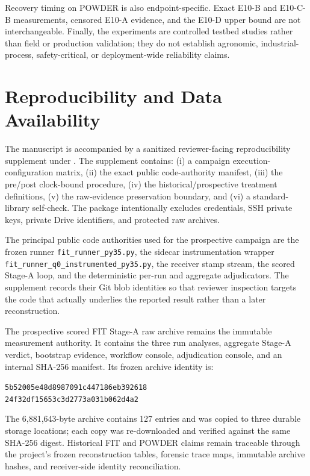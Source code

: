 \documentclass[journal]{IEEEtran}
\begin{document}
Recovery timing on POWDER is also endpoint-specific. Exact E10-B and E10-C-B measurements, censored E10-A evidence, and the E10-D upper bound are not interchangeable. Finally, the experiments are controlled testbed studies rather than field or production validation; they do not establish agronomic, industrial-process, safety-critical, or deployment-wide reliability claims.

\section{Reproducibility and Data Availability}
\label{sec:repro}

The manuscript is accompanied by a sanitized reviewer-facing reproducibility supplement under
.
The supplement contains: (i) a campaign execution-configuration matrix, (ii) the exact public code-authority manifest, (iii) the pre/post clock-bound procedure, (iv) the historical/prospective treatment definitions, (v) the raw-evidence preservation boundary, and (vi) a standard-library self-check. The package intentionally excludes credentials, SSH private keys, private Drive identifiers, and protected raw archives.

The principal public code authorities used for the prospective campaign are the frozen runner \texttt{fit\_runner\_py35.py}, the sidecar instrumentation wrapper \texttt{fit\_runner\_q0\_instrumented\_py35.py}, the receiver stamp stream, the scored Stage-A loop, and the deterministic per-run and aggregate adjudicators. The supplement records their Git blob identities so that reviewer inspection targets the code that actually underlies the reported result rather than a later reconstruction.

The prospective scored FIT Stage-A raw archive remains the immutable measurement authority. It contains the three run analyses, aggregate Stage-A verdict, bootstrap evidence, workflow console, adjudication console, and an internal SHA-256 manifest. Its frozen archive identity is:
\begin{center}
\small\texttt{5b52005e48d8987091c447186eb392618}\\
\texttt{24f32df15653c3d2773a031b062d4a2}
\end{center}
The 6,881,643-byte archive contains 127 entries and was copied to three durable storage locations; each copy was re-downloaded and verified against the same SHA-256 digest. Historical FIT and POWDER claims remain traceable through the project's frozen reconstruction tables, forensic trace maps, immutable archive hashes, and receiver-side identity reconciliation.
\end{document}
